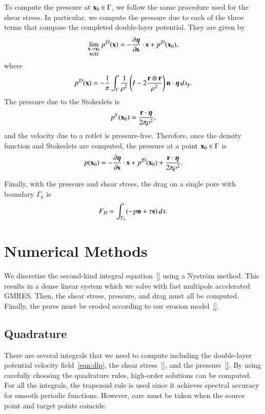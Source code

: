 \documentclass[preprint, 10pt]{elsarticle}
\begin{document}
To compute the pressure at ${\mathbf{x}}_0 \in \Gamma$, we follow the same
procedure used for the shear stress.  In particular, we compute the
pressure due to each of the three terms that compose the completed
double-layer potential.  They are given by
\begin{align}
  \lim_{\substack{{\mathbf{x}} \rightarrow {\mathbf{x}}_0 \\ {\mathbf{x}} \in \Omega}}p^{\mathcal{D}}({\mathbf{x}}) =  
  -\frac{\partial {\boldsymbol\eta}}{\partial {\mathbf{s}}} \cdot {\mathbf{s}} + p^{{\mathcal{D}}}({\mathbf{x}}_0),
\end{align}
where
\begin{align}
  p^{\mathcal{D}}({\mathbf{x}}) = -\frac{1}{\pi}\int_{\Gamma} \frac{1}{\rho^2}
    \left(I - 2 \frac{{\mathbf{r}} \otimes {\mathbf{r}}}{\rho^2}\right) 
    {\mathbf{n}} \cdot {\boldsymbol\eta} \,ds_{\mathbf{y}}.
\end{align}
The pressure due to the Stokeslets is
\begin{align}
  p^S({\mathbf{x}}_0) = \frac{{\mathbf{r}} \cdot {\boldsymbol\eta}}{2\pi\rho^2},
\end{align}
and the velocity due to a rotlet is pressure-free.  Therefore, once the
density function and Stokeslets are computed, the pressure at a point
${\mathbf{x}}_0 \in \Gamma$ is
\begin{align}
  p({\mathbf{x}}_0) = -\frac{\partial {\boldsymbol\eta}}{\partial {\mathbf{s}}} \cdot {\mathbf{s}} + p^{{\mathcal{D}}}({\mathbf{x}}_0) + 
              \frac{{\mathbf{r}} \cdot {\boldsymbol\eta}}{2\pi\rho^2}.
\end{align}

Finally, with the pressure and shear stress, the drag on a single pore
with boundary $\Gamma_k$ is
\begin{align}
  F_D = \int_{\Gamma_k} (-p {\mathbf{n}} + \tau {\mathbf{s}})\,ds.
\end{align}




\section{Numerical Methods\label{s:method}} 
We discretize the second-kind integral equation~\eqref{} using a
Nystr\"om method.  This results in a dense linear system which we solve
with fast multipole accelerated GMRES.  Then, the shear stress,
pressure, and drag must all be computed.  Finally, the pores must be
eroded according to our erosion model~\eqref{}. 

\subsection{Quadrature} 
There are several integrals that we need to compute including the
double-layer potential velocity field~\eqref{eqn:dlp}, the shear
stress~\eqref{}, and the pressure~\eqref{}.  By using carefully choosing
the quadrature rules, high-order solutions can be computed.  For all the
integrals, the trapezoid rule is used since it achieves spectral
accuracy for smooth periodic functions.  However, care must be taken
when the source point and target points coincide.
\end{document}
